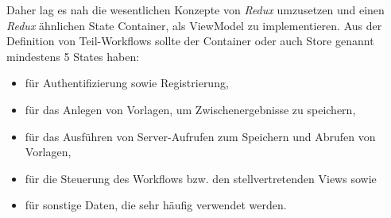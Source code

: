 \documentclass[notables, nomenclature, oneside, 150]{HSMW-Thesis}
\begin{document}
		Daher lag es nah die wesentlichen Konzepte von \textit{Redux} umzusetzen und einen \textit{Redux} ähnlichen State Container, als ViewModel zu implementieren. Aus der Definition von Teil-Workflows sollte der Container oder auch Store genannt mindestens 5 States haben: 
		\begin{itemize}
			\item für Authentifizierung sowie Registrierung,
			\item für das Anlegen von Vorlagen, um Zwischenergebnisse zu speichern,
			\item für das Ausführen von Server-Aufrufen zum Speichern und Abrufen von Vorlagen, 
			\item für die Steuerung des Workflows bzw. den stellvertretenden Views sowie
			\item für sonstige Daten, die sehr häufig verwendet werden.
		\end{itemize}
		
\end{document}
